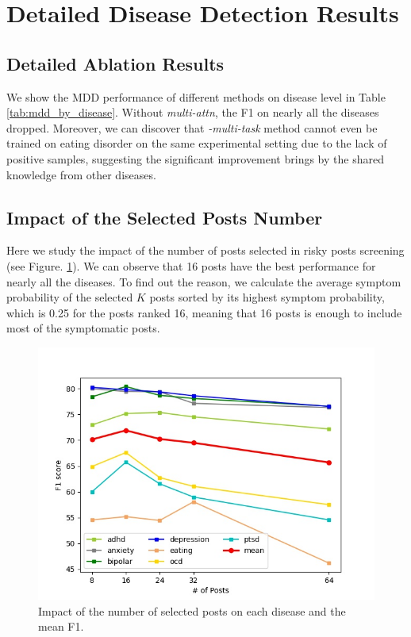 \section{Detailed Disease Detection Results}
\label{apd:mdd_results}

\subsection{Detailed Ablation Results}
\label{apd:abl_results}
We show the MDD performance of different methods on disease level in Table \ref{tab:mdd_by_disease}.
Without \textit{multi-attn}, the F1 on nearly all the diseases dropped. Moreover, we can discover that \textit{-multi-task} method cannot even be trained on eating disorder on the same experimental setting due to the lack of positive samples, suggesting the significant improvement brings by the shared knowledge from other diseases.

\subsection{Impact of the Selected Posts Number}
\label{apd:post_num}
Here we study the impact of the number of posts selected in risky posts screening (see Figure. \ref{fig:post_num}). We can observe that 16 posts have the best performance for nearly all the diseases. To find out the reason, 
we calculate the average symptom probability of the selected $K$ posts sorted by its highest symptom probability, which is 0.25 for the posts ranked 16, meaning that 16 posts is enough to include most of the symptomatic posts.

\begin{figure}[t]
    \centering
    \includegraphics[width=\linewidth]{figures/post_num_impact.jpg}
    \caption{Impact of the number of selected posts on each disease and the mean F1.}
    \label{fig:post_num}
\end{figure}

